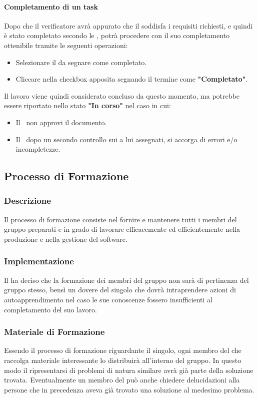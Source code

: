 \paragraph{Completamento di un task}
Dopo che il verificatore avrà appurato che il  soddisfa i requisiti richiesti, e quindi è stato completato secondo le \NdP, potrà procedere con il suo completamento ottenibile tramite le seguenti operazioni:
\begin{itemize}
  \item Selezionare il  da segnare come completato.
  \item Cliccare nella checkbox apposita segnando il termine come \textbf{"Completato"}.
\end{itemize}
Il lavoro viene quindi considerato concluso da questo momento, ma potrebbe essere riportato nello stato \textbf{"In corso"} nel caso in cui:
\begin{itemize}
  \item Il \Pm\ non approvi il documento.
  \item Il \Ver\, dopo un secondo controllo sui  a lui assegnati, si accorga di errori e/o incompletezze. 
\end{itemize}

\subsection{Processo di Formazione}
\subsubsection{Descrizione}
Il processo di formazione consiste nel fornire e mantenere tutti i membri del gruppo preparati e in grado di lavorare efficacemente ed efficientemente nella produzione e nella gestione del software.

\subsubsection{Implementazione}
Il  ha deciso che la formazione dei membri del gruppo non sarà di pertinenza del gruppo stesso, bensì un dovere del singolo che dovrà intraprendere azioni di autoapprendimento nel caso le sue conoscenze fossero insufficienti al completamento del suo lavoro.

\subsubsection{Materiale di Formazione}
Essendo il processo di formazione riguardante il singolo, ogni membro del  che raccolga materiale interessante lo distribuirà all'interno del gruppo. In questo modo il ripresentarsi di problemi di natura similare avrà già parte della soluzione trovata. Eventualmente un membro del  può anche chiedere delucidazioni alla persone che in precedenza aveva già trovato una soluzione al medesimo problema.


